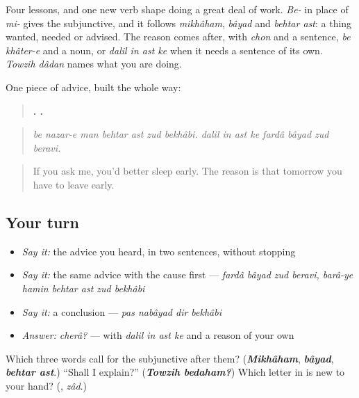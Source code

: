 \begin{grammarlens}[title={What you've built}]
Four lessons, and one new verb shape doing a great deal of work. \emph{Be-} in place of \emph{mi-} gives the subjunctive, and it follows \emph{mikhâham}, \emph{bâyad} and \emph{behtar ast}: a thing wanted, needed or advised. The reason comes after, with \emph{chon} and a sentence, \emph{be khâter-e} and a noun, or \emph{dalil in ast ke} when it needs a sentence of its own. \emph{Towzih dâdan} names what you are doing.

One piece of advice, built the whole way:

\begin{quote}
\textbf{      .        .}
\end{quote}

\begin{quote}
\emph{be nazar-e man behtar ast zud bekhâbi. dalil in ast ke fardâ bâyad zud beravi.}
\end{quote}

\begin{quote}
If you ask me, you'd better sleep early. The reason is that tomorrow you have to leave early.
\end{quote}
\end{grammarlens}

\subsection*{Your turn}
\begin{itemize}
\raggedright
  \item \emph{Say it:} the advice you heard, in two sentences, without stopping
  \item \emph{Say it:} the same advice with the cause first — \emph{fardâ bâyad zud beravi, barâ-ye hamin behtar ast zud bekhâbi}
  \item \emph{Say it:} a conclusion — \emph{pas nabâyad dir bekhâbi}
  \item \emph{Answer:} \emph{cherâ?} — with \emph{dalil in ast ke} and a reason of your own
\end{itemize}

\begin{tcolorbox}[breakable,colback=teal!4,colframe=teal!35!black,title={Before you move on}]
Which three words call for the subjunctive after them? (\emph{\textbf{Mikhâham}}, \emph{\textbf{bâyad}}, \emph{\textbf{behtar ast}}.) \textquotedblleft{}Shall I explain?\textquotedblright{} (\emph{\textbf{Towzih bedaham?}}) Which letter in \textbf{} is new to your hand? (\textbf{}, \emph{zâd}.)
\end{tcolorbox}

